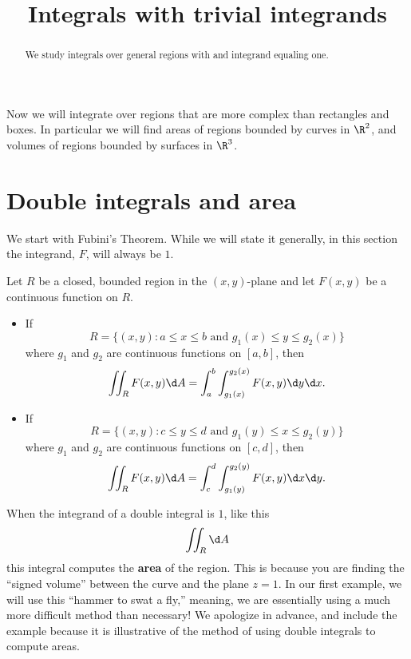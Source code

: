 \documentclass{ximera}
\title[Dig-In:]{Integrals with trivial integrands}
\begin{document}
\begin{abstract}
  We study integrals over general regions with and integrand equaling one.
\end{abstract}
\maketitle


Now we will integrate over regions that are more complex than
rectangles and boxes. In particular we will find areas of regions
bounded by curves in $\R^2$, and volumes of regions bounded by
surfaces in $\R^3$.

\section{Double integrals and area}

We start with Fubini's Theorem. While we will state it generally, in
this section the integrand, $F$, will always be $1$.

\begin{theorem}
  Let $R$ be a closed, bounded region in the $(x,y)$-plane and let
  $F(x,y)$ be a continuous function on $R$.
  \begin{itemize}
  \item If
    \[
    R=\{(x,y):\text{$a\leq x\leq b$ and $g_1(x)\leq y\leq g_2(x)$}\}
    \]
    where $g_1$ and $g_2$ are continuous functions on $[a,b]$, then
    \[
    \iint_R F(x,y) \d A = \int_a^b\int_{g_1(x)}^{g_2(x)} F(x,y)\d y\d x.
    \]
  \item If
    \[
    R=\{(x,y):\text{$c\leq y\leq d$ and $g_1(y)\leq x\leq g_2(y)$}\}
    \]
    where $g_1$ and $g_2$ are continuous functions on $[c,d]$, then
    \[
    \iint_R F(x,y)\d A = \int_c^d\int_{g_1(y)}^{g_2(y)} F(x,y)\d x\d y.
    \]
\end{itemize}
\end{theorem}

When the integrand of a double integral is $1$, like this
\[
\iint_R\d A
\]
this integral computes the \textbf{area} of the region. This is
because you are finding the ``signed volume'' between the curve and
the plane $z=1$. In our first example, we will use this ``hammer to
swat a fly,'' meaning, we are essentially using a much more difficult
method than necessary! We apologize in advance, and include the
example because it is illustrative of the method of using double
integrals to compute areas.
\end{document}
